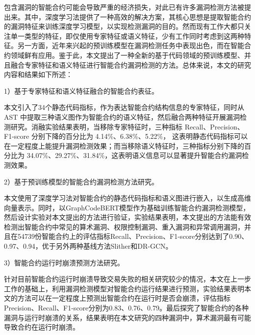 \cleardoublepage
{}
包含漏洞的智能合约可能会导致严重的经济损失，对此已有许多漏洞检测方法被提出来。其中，深度学习法提供了一种高效的解决方案，其核心思想是提取智能合约的漏洞特征来训练深度学习模型，以实现检测漏洞的目的。然而现有工作大都只关注单一类型的特征，即仅使用专家特征或语义特征，少有工作同时考虑到这两种特征。另一方面，近年来兴起的预训练模型在漏洞检测任务中表现出色，而在智能合约领域鲜有应用。鉴于此，本文提出了一种全新的基于代码领域的预训练模型、并且融合专家特征和语义特征进行智能合约漏洞检测的方法。总体来说，本文的研究内容和结果如下所述：

    1）基于专家特征和语义特征融合的智能合约表征。

    本文引入了34个静态代码指标，作为表达智能合约结构信息的专家特征，同时从 AST 中提取三种语义图作为智能合约的语义特征，然后融合两种特征开展漏洞检测研究。消融实验结果表明，当移除专家特征时，三种指标 Recall、Precision、F1-score 分别下降的百分比为 4.14\%、6.38\%、5.22\%， 这表明静态代码指标可以在一定程度上能提升漏洞检测效果；而当移除语义特征时，三种指标分别下降的百分比为 34.07\%、29.27\%、31.84\%，这表明语义信息可以显著提升智能合约漏洞检测效果。

    2）基于预训练模型的智能合约漏洞检测方法研究。
    
    本文使用了深度学习法对智能合约的静态代码指标和语义图进行嵌入，以生成高维向量表示。同时，以GraphCodeBERT模型作为基础训练智能合约漏洞检测模型，然后设计实验对本文提出的方法进行验证，实验结果表明，本文提出的方法能有效检测出智能合约中常见的算术漏洞、权限控制漏洞、重入漏洞和异常调用漏洞，并且在\num{54739}份智能合约上的评估指标Recall、Precision、F1-score分别达到了0.90、0.97、0.94，优于另外两种基线方法Slither和DR-GCN。
    
    3）智能合约运行时崩溃预测方法研究。
    
    针对目前智能合约运行时崩溃导致交易失败的相关研究较少的情况，本文在上一步工作的基础上，利用漏洞检测模型对智能合约运行结果进行预测，实验结果表明本文的方法可以在一定程度上预测出智能合约在运行时是否会崩溃，评估指标Precision、Recall、F1-score分别为0.83、0.76、0.79。最后探究了智能合约的各种漏洞与运行时崩溃的关系，结果表明在本文研究的四种漏洞中，算术漏洞最有可能导致合约在运行时崩溃。



